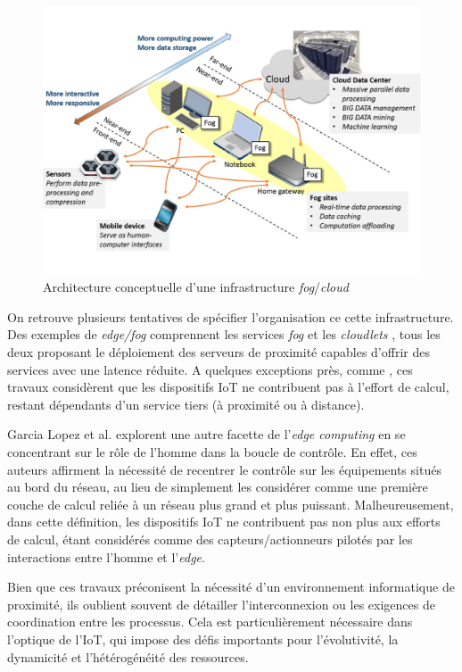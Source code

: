 \begin{figure}
	\centering
	\includegraphics[width=0.75\linewidth]{img/fog}
	\caption{Architecture conceptuelle d'une infrastructure \textit{fog}/\textit{cloud} \cite{10.3389/fnhum.2014.00370}}\label{fig:fog}
\end{figure}

On retrouve plusieurs tentatives de spécifier l'organisation ce cette infrastructure. Des exemples de \textit{edge/fog} comprennent les services \textit{fog} \cite{Bonomi2012} et les \textit{cloudlets} \cite{Satyanarayanan09}, tous les deux proposant le déploiement des serveurs de proximité capables d'offrir des services avec une latence réduite. A quelques exceptions près, comme \cite{Dey2013}, ces travaux considèrent que les dispositifs IoT ne contribuent pas à l'effort de calcul, restant dépendants d'un service tiers (à proximité ou à distance).

Garcia Lopez et al. \cite{Lopez2015} explorent une autre facette de l'\textit{edge computing} en se concentrant sur le rôle de l'homme dans la boucle de contrôle. En effet, ces auteurs affirment la nécessité de recentrer le contrôle sur les équipements situés au bord du réseau, au lieu de simplement les considérer comme une première couche de calcul reliée à un réseau plus grand et plus puissant. %
Malheureusement, dans cette définition, les dispositifs IoT ne contribuent pas non plus aux efforts de calcul, étant considérés comme des capteurs/actionneurs pilotés par les interactions entre l'homme et l'\textit{edge}.

Bien que ces travaux préconisent la nécessité d'un environnement informatique de proximité, ils oublient souvent de détailler l'interconnexion ou les exigences de coordination entre les processus. Cela est particulièrement nécessaire dans l'optique de l'IoT, qui impose des défis importants pour l'évolutivité, la dynamicité et l'hétérogénéité des ressources. 

